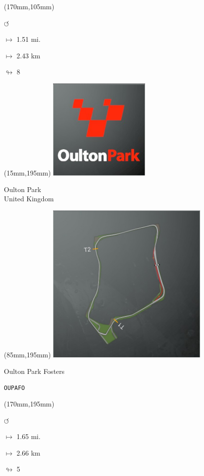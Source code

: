 \begin{textblock*}{30mm}(170mm,105mm)%
\par \Huge$\circlearrowleft$
\Large
\par$\mapsto$ 1.51 mi.
\par$\mapsto$ 2.43 km
\par$\looparrowright$ 8
\end{textblock*}
\begin{textblock*}{60mm}(15mm,195mm)%
\includegraphics[width=50mm]{LG/2015-05-20_00091.png}
\par Oulton Park\\ United Kingdom
\end{textblock*}
\begin{textblock*}{80mm}(85mm,195mm)%
\includegraphics[width=80mm]{TR/2015-05-20_00050.png}
\centerline{Oulton Park Fosters}
\par\hfill\tiny\tt OUPAFO\\
\end{textblock*}
\begin{textblock*}{30mm}(170mm,195mm)%
\par \Huge$\circlearrowleft$
\Large
\par$\mapsto$ 1.65 mi.
\par$\mapsto$ 2.66 km
\par$\looparrowright$ 5
\end{textblock*}
\null\newpage

